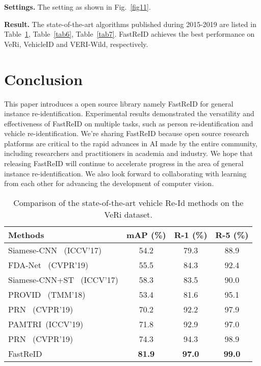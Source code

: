\documentclass[10pt,twocolumn,letterpaper]{article}
\begin{document}
\noindent\textbf{Settings.} The setting as shown in Fig.~\ref{fig11}.



\noindent\textbf{Result.} The state-of-the-art algorithms published during 2015-2019 are listed in Table~\ref{tab5}, Table~\ref{tab6}, Table~\ref{tab7}. FastReID achieves the best performance on VeRi, VehicleID and VERI-Wild, respectively.

\section{Conclusion}
This paper introduces a open source library namely FastReID for general instance re-identification. Experimental results demonstrated the versatility and effectiveness of FastReID on multiple tasks, such as person re-identification and vehicle re-identification. We’re sharing FastReID because open source research platforms are critical to the rapid advances in AI made by the entire community, including researchers and practitioners in academia and industry. We hope that releasing FastReID will continue to accelerate progress in the area of general instance re-identification. We also look forward to collaborating with learning from each other for advancing the development of computer vision.

\begin{table}[t]
\caption{Comparison of the state-of-the-art vehicle Re-Id methods on the VeRi dataset.}
\label{tab:table4}
\centering
  \fontsize{8}{8}\selectfont
  \label{tab5}
\begin{tabular}{|l|c|c|c|} \hline
Methods                                           & mAP (\%)     & R-1 (\%)     & R-5 (\%)  \\  \hline

Siamese-CNN~\cite{iccv/ShenXLYW17}    (ICCV'17)    & 54.2         & 79.3             & 88.9     \\
FDA-Net~\cite{cvpr/LouB0WD19}    (CVPR'19)    & 55.5         & 84.3             & 92.4     \\ 
Siamese-CNN+ST~\cite{iccv/ShenXLYW17} (ICCV'17)    & 58.3           & 83.5             & 90.0     \\ 
PROVID~\cite{tmm/LiuLMM18}    (TMM'18)    & 53.4         & 81.6             & 95.1     \\ 
PRN~\cite{cvpr/HeLZT19}        (CVPR'19)    & 70.2         & 92.2             & 97.9     \\
PAMTRI~\cite{iccv/TangNBTHKWY19}(ICCV'19)    & 71.8         & 92.9             & 97.0     \\  
PRN~\cite{cvpr/HeLZT19}    (CVPR'19)    & 74.3         & 94.3             & 98.9     \\ \hline
FastReID                                 & \textbf{81.9} & \textbf{97.0} & \textbf{99.0}     \\  \hline
\end{tabular}
\end{table}
\end{document}
